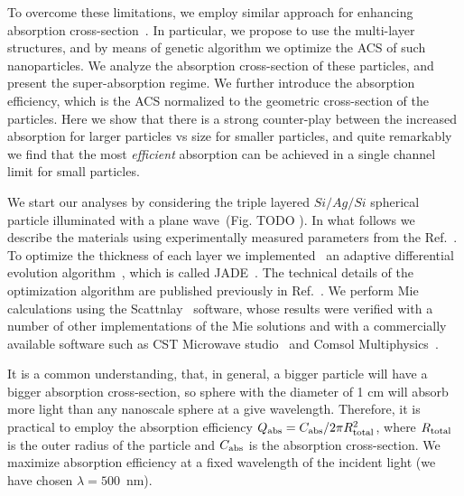 \documentclass[aps,prl,twocolumn,showpacs,superscriptaddress,groupedaddress]{revtex4-1}
\begin{document}
To overcome these limitations, we employ similar approach for
enhancing absorption cross-section~\cite{Fan-2011}. In particular, we
propose to use the multi-layer structures, and by means of genetic
algorithm we optimize the ACS of such nanoparticles. We analyze the
absorption cross-section of these particles, and present the
super-absorption regime. We further introduce the absorption
efficiency, which is the ACS normalized to the geometric cross-section
of the particles. Here we show that there is a strong counter-play
between the increased absorption for larger particles vs size for
smaller particles, and quite remarkably we find that the most {\em
  efficient} absorption can be achieved in a single channel limit for
small particles.

We start our analyses by considering the triple layered $Si/Ag/Si$
spherical particle illuminated with a plane wave~(Fig. TODO ). In what
follows we describe the materials using experimentally measured
parameters from the Ref.~\cite{palik-1997}.  To optimize the thickness of each
layer we implemented~\cite{JADE-web} an adaptive differential
evolution algorithm~\cite{Storn-DE-first-1997}, which is called
JADE~\cite{Jingqiao-JADE-2009}.  The technical details of the
optimization algorithm are published previously in
Ref.~\cite{Ladutenko-2014}. We perform Mie calculations using the
Scattnlay~\cite{Pena-scattnlay-2009,Scattnlay-web} software, whose results were
verified with a number of other implementations of the Mie solutions
and with a commercially available software such as CST Microwave
studio~\cite{CST-web} and Comsol Multiphysics~\cite{Comsol-web}.

It is a common understanding, that, in general, a bigger particle will have a bigger
absorption cross-section, so sphere with the diameter of 1 cm will
absorb more light than any nanoscale sphere at a give wavelength. Therefore, it is practical  to employ
the absorption efficiency $Q_{\rm abs}=C_{\rm abs}/2\pi R_{\rm total}^2$,
where $R_{\rm total}$ is the outer radius of the particle and $C_{\rm
  abs}$ is the absorption cross-section. We maximize absorption
efficiency at a fixed wavelength of the incident light (we have chosen
$\lambda=500$~nm).
\end{document}
